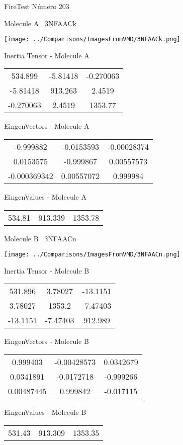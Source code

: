 \vtab[-3cm]
\begin{center}
{\large FireTest \tab Número 203}
\end{center}
\begin{multicols}{2}
\begin{center}

Molecule A \
3NFAACk

\texttt{[image: ../Comparisons/ImagesFromVMD/3NFAACk.png]}

Inertia Tensor - Molecule A \\
\begin{tabular}{|c c c|}
534.899	 & 	-5.81418	 & 	-0.270063	 \\
-5.81418	 & 	913.263	 & 	2.4519	 \\
-0.270063	 & 	2.4519	 & 	1353.77
\end{tabular}

\vtab
 EingenVectors - Molecule A     \\
\begin{tabular}{|c c c|}
-0.999882	 & 	-0.0153593	 & 	-0.00028374	 \\
0.0153575	 & 	-0.999867	 & 	0.00557573	 \\
-0.000369342	 & 	0.00557072	 & 	0.999984
\end{tabular}

\vtab
 EingenValues - Molecule A     \\
\begin{tabular}{|c c c|}
534.81	 & 	913.339	 & 	1353.78	 \\
\end{tabular}
\columnbreak

Molecule B \
3NFAACn

\texttt{[image: ../Comparisons/ImagesFromVMD/3NFAACn.png]}

Inertia Tensor - Molecule B \\
\begin{tabular}{|c c c|}
531.896	 & 	3.78027	 & 	-13.1151	 \\
3.78027	 & 	1353.2	 & 	-7.47403	 \\
-13.1151	 & 	-7.47403	 & 	912.989
\end{tabular}

\vtab
 EingenVectors - Molecule B     \\
\begin{tabular}{|c c c|}
0.999403	 & 	-0.00428573	 & 	0.0342679	 \\
0.0341891	 & 	-0.0172718	 & 	-0.999266	 \\
0.00487445	 & 	0.999842	 & 	-0.017115
\end{tabular}

\vtab
 EingenValues - Molecule B     \\
\begin{tabular}{|c c c|}
531.43	 & 	913.309	 & 	1353.35	 \\
\end{tabular}

\end{center}
\end{multicols}

